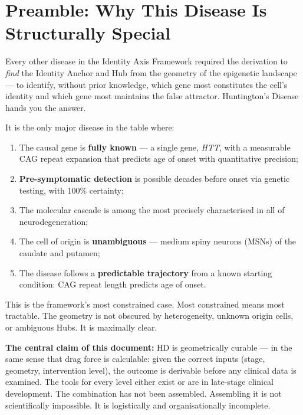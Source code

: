 \documentclass[12pt,a4paper]{article}
\newenvironment{warnenv}{%
  \begin{tcolorbox}[
    colback=red!5,
    colframe=warnbox,
    boxrule=1pt,
    arc=3pt,
    left=8pt, right=8pt,
    top=6pt, bottom=6pt,
    breakable
  ]
}{%
  \end{tcolorbox}
}
\begin{document}
\section{Preamble: Why This Disease Is Structurally Special}

Every other disease in the Identity Axis Framework required
the derivation to \emph{find} the Identity Anchor and Hub
from the geometry of the epigenetic landscape --- to
identify, without prior knowledge, which gene most
constitutes the cell's identity and which gene most maintains
the false attractor. Huntington's Disease hands you the
answer.

It is the only major disease in the table where:
\begin{enumerate}[label=(\alph*)]
  \item The causal gene is \textbf{fully known} --- a single
    gene, \textit{HTT}, with a measurable CAG repeat
    expansion that predicts age of onset with quantitative
    precision;
  \item \textbf{Pre-symptomatic detection} is possible
    decades before onset via genetic testing, with 100\%
    certainty;
  \item The molecular cascade is among the most precisely
    characterised in all of neurodegeneration;
  \item The cell of origin is \textbf{unambiguous} ---
    medium spiny neurons (MSNs) of the caudate and putamen;
  \item The disease follows a \textbf{predictable trajectory}
    from a known starting condition: CAG repeat length
    predicts age of onset.
\end{enumerate}

This is the framework's most constrained case. Most
constrained means most tractable. The geometry is not
obscured by heterogeneity, unknown origin cells, or
ambiguous Hubs. It is maximally clear.

\begin{warnenv}
\textbf{The central claim of this document:} HD is
geometrically curable --- in the same sense that drag force
is calculable: given the correct inputs (stage, geometry,
intervention level), the outcome is derivable before any
clinical data is examined. The tools for every level either
exist or are in late-stage clinical development. The
combination has not been assembled. Assembling it is not
scientifically impossible. It is logistically and
organisationally incomplete.
\end{warnenv}
\end{document}

